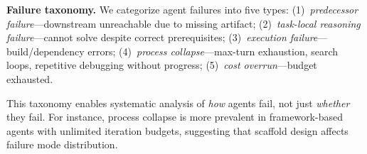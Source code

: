 \textbf{Failure taxonomy.}
We categorize agent failures into five types:
(1)~\emph{predecessor failure}---downstream unreachable due to missing artifact;
(2)~\emph{task-local reasoning failure}---cannot solve despite correct prerequisites;
(3)~\emph{execution failure}---build/dependency errors;
(4)~\emph{process collapse}---max-turn exhaustion, search loops, repetitive debugging without progress;
(5)~\emph{cost overrun}---budget exhausted.

This taxonomy enables systematic analysis of \emph{how} agents fail, not just \emph{whether} they fail.
For instance, process collapse is more prevalent in framework-based agents with unlimited iteration budgets, suggesting that scaffold design affects failure mode distribution.